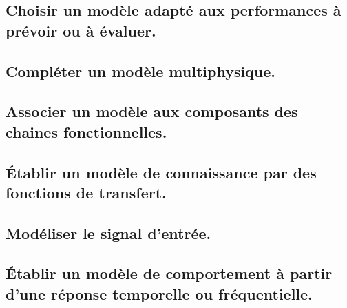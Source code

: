 \documentclass[10pt,fleqn]{book}
\newcommand{\repRel}{../..}
\newcommand{\repStyle}{\repRel/Style}
\newcommand{\td}{fichier_td}
\newcommand{\repExos}{\repRel/ExercicesCompetences}
\newcommand{\repExo}{dossier}
\begin{document}
\subsection{Choisir un modèle adapté aux performances à prévoir ou à évaluer.} 

\begin{multicols}{2} 

\end{multicols}

\subsection{Compléter un modèle multiphysique.} 

\begin{multicols}{2} 

\end{multicols}

\subsection{Associer un modèle aux composants des chaines fonctionnelles.} 

\begin{multicols}{2} 

\end{multicols}

\subsection{Établir un modèle de connaissance par des fonctions de transfert.} 

\begin{multicols}{2} 

\renewcommand{\repExo}{\repExos/B2_ProposerModele/B2_04_ModeleConnaissance/51_MCC}
\renewcommand{\td}{51_MCC}
\graphicspath{{\repStyle/png/}{\repExo/images/}}


\end{multicols}

\subsection{Modéliser le signal d'entrée.} 

\begin{multicols}{2} 

\end{multicols}

\subsection{Établir un modèle de comportement à partir d'une réponse temporelle ou fréquentielle. } 
\end{document}
